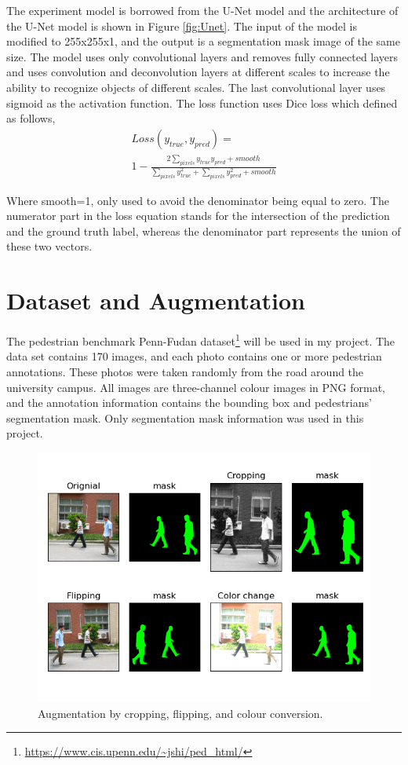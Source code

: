\documentclass[10pt, a4paper]{article}
\begin{document}
\begin{multicols}{2}
	The experiment model is borrowed from the U-Net model and the architecture of the U-Net model is shown in Figure \ref{fig:Unet}. The input of the model is modified to 255x255x1, and the output is a segmentation mask image of the same size. The model uses only convolutional layers and removes fully connected layers and uses convolution and deconvolution layers at different scales to increase the ability to recognize objects of different scales. The last convolutional layer uses sigmoid as the activation function. The loss function uses Dice loss which defined as follows,
	\begin{equation}
	\begin{aligned}
	Loss(y_{true}, y_{pred}) = \\1 - \frac{2\sum_{pixels}y_{true}y_{pred} + smooth }{\sum_{pixels}y_{true}^2 + \sum_{pixels}y_{pred}^2 + smooth}
	\end{aligned}
	\end{equation}
	\par
	Where smooth=1, only used to avoid the denominator being equal to zero. The numerator part in the loss equation stands for the intersection of the prediction and the ground truth label, whereas the denominator part represents the union of these two vectors.


	\section{Dataset and Augmentation} \justify
	The pedestrian benchmark Penn-Fudan dataset\footnote{\label{}\url{https://www.cis.upenn.edu/~jshi/ped_html/}} will be used in my project. The data set contains 170 images, and each photo contains one or more pedestrian annotations. These photos were taken randomly from the road around the university campus. All images are three-channel colour images in PNG format, and the annotation information contains the bounding box and pedestrians’ segmentation mask. Only segmentation mask information was used in this project.
	\begin{figure}[htb] %
       \centering
	  \includegraphics[width=0.5\linewidth]{dataset.png}
	  \caption{Augmentation by cropping, flipping, and colour conversion.}
	  \label{fig:augmentation}
	\end{figure}


\end{multicols}
\end{document}
